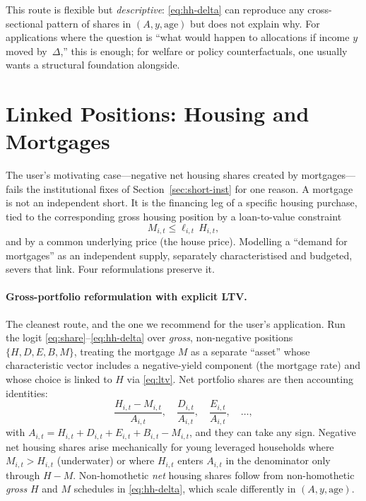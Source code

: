 \documentclass[11pt,a4paper]{article}
\begin{document}
This route is flexible but \emph{descriptive}: \eqref{eq:hh-delta} can
reproduce any cross-sectional pattern of shares in $(A,y,\mathrm{age})$
but does not explain why. For applications where the question is
``what would happen to allocations if income $y$ moved by~$\Delta$,''
this is enough; for welfare or policy counterfactuals, one usually
wants a structural foundation alongside.

\section{Linked Positions: Housing and Mortgages}\label{sec:linked}

The user's motivating case---negative net housing shares created by
mortgages---fails the institutional fixes of Section~\ref{sec:short-inst}
for one reason. A mortgage is not an independent short. It is the
financing leg of a specific housing purchase, tied to the corresponding
gross housing position by a loan-to-value constraint
\begin{equation}
M_{i,t} \le \ell_{i,t}\,H_{i,t},
\label{eq:ltv}
\end{equation}
and by a common underlying price (the house price). Modelling a
``demand for mortgages'' as an independent supply, separately
characteristised and budgeted, severs that link. Four reformulations
preserve it.

\paragraph{Gross-portfolio reformulation with explicit LTV.}
The cleanest route, and the one we recommend for the user's
application. Run the logit \eqref{eq:share}--\eqref{eq:hh-delta} over
\emph{gross}, non-negative positions $\{H, D, E, B, M\}$, treating the
mortgage $M$ as a separate ``asset'' whose characteristic vector
includes a negative-yield component (the mortgage rate) and whose
choice is linked to $H$ via \eqref{eq:ltv}. Net portfolio shares are
then accounting identities:
\begin{equation}
\frac{H_{i,t} - M_{i,t}}{A_{i,t}}, \quad \frac{D_{i,t}}{A_{i,t}}, \quad \frac{E_{i,t}}{A_{i,t}}, \quad \dots,
\end{equation}
with $A_{i,t} = H_{i,t} + D_{i,t} + E_{i,t} + B_{i,t} - M_{i,t}$, and
they can take any sign. Negative net housing shares arise mechanically
for young leveraged households where $M_{i,t} > H_{i,t}$ (underwater)
or where $H_{i,t}$ enters $A_{i,t}$ in the denominator only through
$H - M$. Non-homothetic \emph{net} housing shares follow from
non-homothetic \emph{gross} $H$ and $M$ schedules in
\eqref{eq:hh-delta}, which scale differently in $(A,y,\mathrm{age})$.
\end{document}
